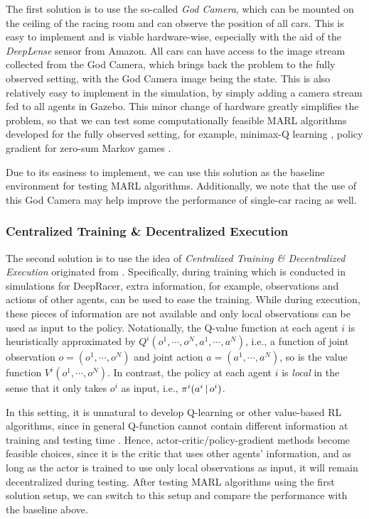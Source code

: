 The first solution is to use the so-called \emph{God Camera}, which can be  mounted on the ceiling of the racing room and can observe the position of all cars. This is easy to implement and is viable hardware-wise, especially with the aid of the \emph{DeepLense} sensor from Amazon. All cars can have access to the image stream collected from the God Camera, which brings back the problem to the fully observed setting, with the God Camera image being the state. This is also relatively easy to implement in the simulation, by simply adding a camera stream fed to all agents in Gazebo. This minor change of  hardware  greatly simplifies the problem, so that we can  test some computationally feasible MARL  algorithms developed for the fully observed setting, for example, minimax-Q learning \citep{littman1994markov}, policy gradient for zero-sum Markov games  \citep{pinto2017robust}.


Due to its easiness to implement, we can use this solution as the baseline environment for testing MARL algorithms. 
 Additionally, we note that the use of this God Camera may help improve the performance 	of single-car racing as well. 
  
  
  
\subsubsection{Centralized Training \& Decentralized Execution} 


The second solution is to use the idea of \emph{Centralized Training \& Decentralized Execution} originated from \cite{foerster2016learning,lowe2017multi}. Specifically, during training which is conducted in simulations for DeepRacer, extra information, for example, observations and actions of other agents, can be used  to ease the training. While during execution, these pieces of information are not available and only local observations can be used as input to the policy. 
Notationally, the Q-value function at each agent $i$ is heuristically approximated by $Q^i(o^1,\cdots,o^N,a^1,\cdots,a^N)$, i.e., a function of joint observation $o=(o^1,\cdots,o^N)$ and joint action $a=(a^1,\cdots,a^N)$, so is the value function $V^i(o^1,\cdots,o^N)$. In contrast, the policy at each agent $i$ is \emph{local} in the sense that it only takes $o^i$ as input, i.e., $\pi^i(a^i{\,|\,} o^i)$.

In this setting, it is unnatural to develop Q-learning or other value-based RL algorithms, since in general Q-function cannot contain different information at training and testing time \citep{lowe2017multi}.  
  Hence, actor-critic/policy-gradient methods become feasible choices, since it is the critic that uses other agents' information, and   as long as the actor is trained to use only local observations as input,  it will remain  decentralized during testing. 
  After testing MARL algorithms using the first solution setup, we can switch to this setup and compare the performance with the baseline above.   
  
  


